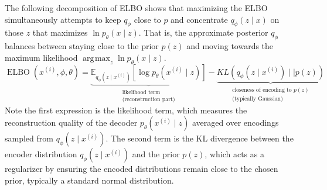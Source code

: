 \documentclass{article}
\DeclareMathOperator{\elbo}{ELBO}
\DeclareMathOperator*{\argmax}{\arg\!\max}
\begin{document}
  \begin{corollary}
    \label{thm:decomposition-of-elbo}
    The following decomposition of ELBO shows that maximizing the ELBO simultaneously attempts to keep $q_\phi$ close to $p$ and concentrate $q_\phi(z \mid x)$ on those $z$ that maximizes $\ln p_\theta (x \mid z)$. That is, the approximate posterior $q_\phi$ balances between staying close to the prior $p(z)$ and moving towards the maximum likelihood $\argmax_z \ln p_\theta (x \mid z)$. 
    \begin{equation}
      \elbo(x^{(i)}, \phi, \theta) = \underbrace{\mathbb{E}_{q_\phi (z \mid x^{(i)})} [\log p_{\theta} (x^{(i)} \mid z)]}_{\substack{\text{likelihood term} \\ \text{(reconstruction part)}}}- \underbrace{KL(q_{\phi} (z \mid x^{(i)}) \mid\mid p(z))}_{\substack{\text{closeness of encoding to } p(z) \\ \text{(typically Gaussian)}}}
    \end{equation}
    Note the first expression is the likelihood term, which measures the reconstruction quality of the decoder $p_\theta(x^{(i)} \mid z)$ averaged over encodings sampled from $q_\phi(z \mid x^{(i)})$. The second term is the KL divergence between the encoder distribution $q_\phi(z \mid x^{(i)})$ and the prior $p(z)$, which acts as a regularizer by ensuring the encoded distributions remain close to the chosen prior, typically a standard normal distribution.
  \end{corollary}
\end{document}
